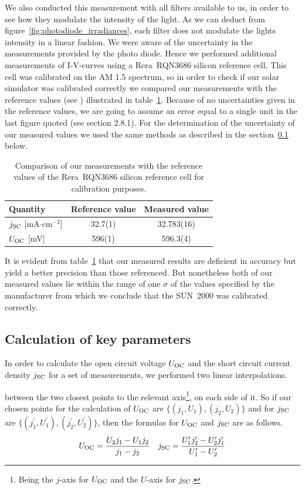 We also conducted this measurement with all filters available to us, in order to see how they modulate the intensity of the light. As we can deduct from figure~\ref{fig:photodiode_irradiances}, each filter does not modulate the lights intensity in a linear fashion.\mypar
We were aware of the uncertainty in the measurements provided by the photo diode. Hence we performed additional measurements of I-V-curves using a Rera~RQN3686 silicon reference cell. This cell was calibrated on the AM 1.5 spectrum, so in order to check if our solar simulator was calibrated correctly we compared our measurements with the reference values (see \cite{reracat}) illustrated in table~\ref{tab:reracomp}. Because of no uncertainties given in the reference values, we are going to assume an error equal to a single unit in the last figure quoted (see \cite{measurements} section 2.8.1). For the determination of the uncertainty of our measured values we used the same methods as described in the section~\ref{subsec:calckeyparams} below.
\begin{table}[h]\centering
\caption{Comparison of our measurements with the reference values of the Rera~RQN3686 silicon reference cell for calibration purposes.}
\label{tab:reracomp}
\begin{tabular}{@{}lcc@{}}\toprule
Quantity & Reference value & Measured value\\ \midrule
$j_{\text{SC}}$ [mA$\cdot$cm$^{-2}$] & 32.7(1) & 32.783(16) \\
$U_{\text{OC}}$ [mV]& 596(1) & 596.3(4) \\ \bottomrule
\end{tabular}
\end{table}

It is evident from table~\ref{tab:reracomp} that our measured results are deficient in accuracy but yield a better precision than those referenced. But nonetheless both of our measured values lie within the range of one $\sigma$ of the values specified by the manufacturer from which we conclude that the SUN~2000 was calibrated correctly.


\subsection{Calculation of key parameters}\label{subsec:calckeyparams}
In order to calculate the open circuit voltage $U_{\text{OC}}$ and the short circuit current density $j_{\text{SC}}$ for a set of measurements, we performed two linear interpolations.

 between the two closest points to the relevant axis\footnote{Being the $j$-axis for $U_{\text{OC}}$ and the $U$-axis for $j_{\text{SC}}$.}, on each side of it. So if our chosen points for the calculation of $U_{\text{OC}}$ are $\{(j_1,U_1),(j_2,U_2)\}$ and for $j_{\text{SC}}$ are $\{(j_1^\prime,U_1^\prime),(j_2^\prime,U_2^\prime)\}$, then the formulas for $U_{\text{OC}}$ and $j_{\text{SC}}$ are as follows.
\begin{align}
U_{\text{OC}} = \frac{U_2 j_1 - U_1 j_2}{j_1-j_2}\quad j_{\text{SC}} = \frac{U_1^\prime j_2^\prime - U_2^\prime j_1^\prime}{U_1^\prime-U_2^\prime}
\end{align}

